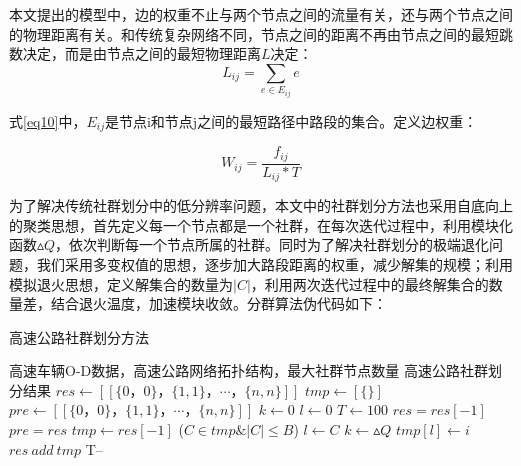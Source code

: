 				本文提出的模型中，边的权重不止与两个节点之间的流量有关，还与两个节点之间的物理距离有关。和传统复杂网络不同，节点之间的距离不再由节点之间的最短跳数决定，而是由节点之间的最短物理距离$L$决定：
				\begin{equation}
				L_{ij}=\sum\limits_{e \in E_{ij}} {e}
				\label{eq10}
				\end{equation}

				式\ref{eq10}中，$E_{ij}$是节点i和节点j之间的最短路径中路段的集合。定义边权重：


				\begin{equation}
				W_{ij}=\frac{f_{ij}}{L_{ij}*T}
				\label{eq11}
				\end{equation}

				为了解决传统社群划分中的低分辨率问题，本文中的社群划分方法也采用自底向上的聚类思想，首先定义每一个节点都是一个社群，在每次迭代过程中，利用模块化函数$\vartriangle Q$，依次判断每一个节点所属的社群。同时为了解决社群划分的极端退化问题，我们采用多变权值的思想\parencite{Kerner2015The}，逐步加大路段距离的权重，减少解集的规模；利用模拟退火思想，定义解集合的数量为$|C|$，利用两次迭代过程中的最终解集合的数量差，结合退火温度，加速模块收敛。分群算法伪代码如下：

				\begin{algorithm}[h]
		        \caption{高速公路社群划分方法}  
		        \label{shequn}
		        \begin{algorithmic}[1] %
		            \Require 高速车辆O-D数据，高速公路网络拓扑结构，最大社群节点数量
		            \Ensure 高速公路社群划分结果
		                \State $res\gets [[\{0，0\}，\{1,1\}，\cdots，\{n,n\}]]$ 
		                \State $tmp\gets [\{\}]$
		                \State $pre\gets [[\{0，0\}，\{1,1\}，\cdots，\{n,n\}]]$ 
		                \State $k\gets 0$  
		                \State $l\gets 0$
		                \State $T\gets 100$  
		                	\State $res=res[-1]$
		                	\State $pre=res$
			                	\State $tmp\gets res[-1]$  
			                		\For($C \in tmp \& |C| \le B$)
				                        	\State $l\gets C$  
				                        	\State $k\gets {\vartriangle Q}$  
			                    		\EndIf	
			                		\EndFor
			                    	\State $tmp[l] \gets i$ 
			                	\EndFor
			                	\State $res \ add \ tmp$
		                	\EndWhile
		                	\State T--
		                \EndWhile  
		                \State {}  
		            \EndFunction  
		        \end{algorithmic}  
		    	\end{algorithm} 

